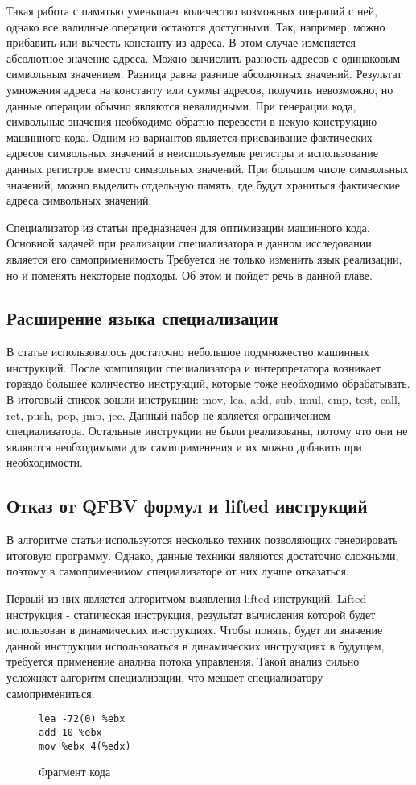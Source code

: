 \documentclass{spbau-diploma}
\begin{document}
Такая работа с памятью уменьшает количество возможных операций с ней, однако все валидные операции остаются доступными. Так, например, можно прибавить или вычесть константу из адреса. В этом случае изменяется абсолютное значение адреса. Можно вычислить разность адресов с одинаковым символьным значением. Разница равна разнице абсолютных значений. Результат умножения адреса на константу или суммы адресов, получить невозможно, но данные операции обычно являются невалидными. При генерации кода, символьные значения необходимо обратно перевести в некую конструкцию машинного кода. Одним из вариантов является присваивание фактических адресов символьных значений в неиспользуемые регистры и использование данных регистров вместо символьных значений. При большом числе символьных значений, можно выделить отдельную память, где будут храниться фактические адреса символьных значений.

Специализатор из статьи \cite{PEMC} предназначен для оптимизации машинного кода. Основной задачей при реализации специализатора в данном исследовании является его самоприменимость Требуется не только изменить язык реализации, но и поменять некоторые подходы. Об этом и пойдёт речь в данной главе.
\subsection{ Раcширение языка специализации}
\label{part:4.4}
В статье \cite{PEMC} использовалось достаточно небольшое подмножество машинных инструкций. После компиляции специализатора и интерпретатора возникает гораздо большее количество инструкций, которые тоже необходимо обрабатывать. В итоговый список вошли инструкции: mov, lea, add, sub, imul, cmp, test, call, ret, push, pop, jmp, jcc. Данный набор не является ограничением специализатора. Остальные инструкции не были реализованы, потому что они не являются необходимыми для самиприменения и их можно добавить при необходимости.
\subsection{ Отказ от QFBV формул и lifted инструкций}
\label{part:4.5}

В алгоритме статьи \cite{PEMC} используются несколько техник позволяющих генерировать итоговую программу. Однако, данные техники являются достаточно сложными, поэтому в самоприменимом специализаторе от них лучше отказаться. 

Первый из них является алгоритмом выявления lifted инструкций. Lifted инструкция - статическая инструкция, результат вычисления которой будет использован в динамических инструкциях. Чтобы понять, будет ли значение данной инструкции использоваться в динамических инструкциях в будущем, требуется применение анализа потока управления. Такой анализ сильно усложняет алгоритм специализации, что мешает специализатору самопримениться. 
\begin{wrapfigure}{r}{0.4\textwidth}
\begin{lstlisting}[xleftmargin = 20pt]
lea -72(0) %ebx
add 10 %ebx
mov %ebx 4(%edx)
\end{lstlisting}
\caption{Фрагмент кода}
\label{fig:qfbv1}
\end{wrapfigure}
\end{document}
